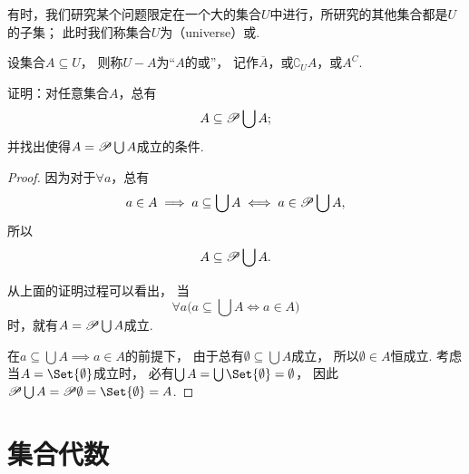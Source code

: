 \begin{definition}[全集、补集]
有时，我们研究某个问题限定在一个大的集合\(U\)中进行，所研究的其他集合都是\(U\)的子集；
此时我们称集合\(U\)为（universe）或.

设集合\(A \subseteq U\)，
则称\(U-A\)为“\(A\)的或”，
记作\(\overline{A}\)，或\(\complement_U A\)，或\(A^C\).
\end{definition}

\begin{example}
证明：对任意集合\(A\)，总有
\begin{equation}\label{equation:集合论.系的并的幂集包含系}
	A \subseteq \mathscr{P} \bigcup A;
\end{equation}
并找出使得\(A = \mathscr{P} \bigcup A\)成立的条件.
\begin{proof}
因为对于\(\forall a\)，总有\[
	a \in A
	\implies
	a \subseteq \bigcup A
	\iff
	a \in \mathscr{P} \bigcup A,
\]
所以\[
	A \subseteq \mathscr{P} \bigcup A.
\]

从上面的证明过程可以看出，
当\[
	\forall a \bigl( a \subseteq \bigcup A \iff a \in A \bigr)
\]时，就有\(A = \mathscr{P} \bigcup A\)成立.

在\(a \subseteq \bigcup A \implies a \in A\)的前提下，
由于总有\(\emptyset \subseteq \bigcup A\)成立，
所以\(\emptyset \in A\)恒成立.
考虑当\(A = \Set{\emptyset}\)成立时，
必有\(\bigcup A = \bigcup\Set{\emptyset} = \emptyset\)，
因此\(\Powerset \bigcup A = \Powerset \emptyset = \Set{\emptyset} = A\).
\end{proof}
\end{example}


\section{集合代数}

